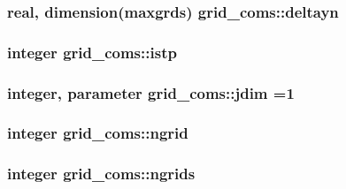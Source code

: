 \subsubsection[{\texorpdfstring{deltayn}{deltayn}}]{\setlength{\rightskip}{0pt plus 5cm}real, dimension(maxgrds) grid\+\_\+coms\+::deltayn}\hypertarget{namespacegrid__coms_a9223404a2c92ad4c68494e9200f2d604}{}\label{namespacegrid__coms_a9223404a2c92ad4c68494e9200f2d604}
\subsubsection[{\texorpdfstring{istp}{istp}}]{\setlength{\rightskip}{0pt plus 5cm}integer grid\+\_\+coms\+::istp}\hypertarget{namespacegrid__coms_abf2dd76ce141fe111aca84a224e4df29}{}\label{namespacegrid__coms_abf2dd76ce141fe111aca84a224e4df29}
\subsubsection[{\texorpdfstring{jdim}{jdim}}]{\setlength{\rightskip}{0pt plus 5cm}integer, parameter grid\+\_\+coms\+::jdim =1}\hypertarget{namespacegrid__coms_ae52c617003c61ec2de61c4615fd9c707}{}\label{namespacegrid__coms_ae52c617003c61ec2de61c4615fd9c707}
\subsubsection[{\texorpdfstring{ngrid}{ngrid}}]{\setlength{\rightskip}{0pt plus 5cm}integer grid\+\_\+coms\+::ngrid}\hypertarget{namespacegrid__coms_a40741410645b943eedf06a7c11a6197d}{}\label{namespacegrid__coms_a40741410645b943eedf06a7c11a6197d}
\subsubsection[{\texorpdfstring{ngrids}{ngrids}}]{\setlength{\rightskip}{0pt plus 5cm}integer grid\+\_\+coms\+::ngrids}\hypertarget{namespacegrid__coms_ae4989ce85dc7d8d012ce238bcdc5946d}{}\label{namespacegrid__coms_ae4989ce85dc7d8d012ce238bcdc5946d}
